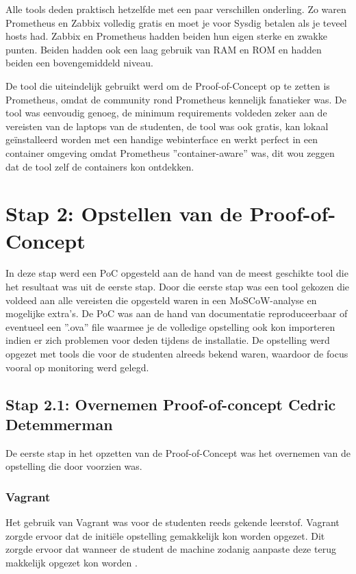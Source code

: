 Alle tools deden praktisch hetzelfde met een paar verschillen onderling. Zo waren Prometheus en Zabbix volledig gratis en moet je voor Sysdig betalen als je teveel hosts had. Zabbix en Prometheus hadden beiden hun eigen sterke en zwakke punten. Beiden hadden ook een laag gebruik van RAM en ROM en hadden beiden een bovengemiddeld niveau.

De tool die uiteindelijk gebruikt werd om de Proof-of-Concept op te zetten is Prometheus, omdat de community rond Prometheus kennelijk fanatieker was. De tool was eenvoudig genoeg, de minimum requirements voldeden zeker aan de vereisten van de laptops van de studenten, de tool was ook gratis, kan lokaal geïnstalleerd worden met een handige webinterface en werkt perfect in een container omgeving omdat Prometheus ''container-aware'' was, dit wou zeggen dat de tool zelf de containers kon ontdekken.
\clearpage

\section{Stap 2: Opstellen van de Proof-of-Concept}

In deze stap werd een PoC opgesteld aan de hand van de meest geschikte tool die het resultaat was uit de eerste stap. Door die eerste stap was een tool gekozen die voldeed aan alle vereisten die opgesteld waren in een MoSCoW-analyse en mogelijke extra's. De PoC was aan de hand van documentatie reproduceerbaar of eventueel een ''.ova'' file waarmee je de volledige opstelling ook kon importeren indien er zich problemen voor deden tijdens de installatie. De opstelling werd opgezet met tools die voor de studenten alreeds bekend waren, waardoor de focus vooral op monitoring werd gelegd.

\subsection{Stap 2.1: Overnemen Proof-of-concept Cedric Detemmerman}

De eerste stap in het opzetten van de Proof-of-Concept was het overnemen van de opstelling die door \textcite{Cedric2019} voorzien was.  

\subsubsection{Vagrant}

Het gebruik van Vagrant was voor de studenten reeds gekende leerstof. Vagrant zorgde ervoor dat de initiële opstelling gemakkelijk kon worden opgezet. Dit zorgde ervoor dat wanneer de student de machine zodanig aanpaste deze terug makkelijk opgezet kon worden \autocite{Cedric2019}.

